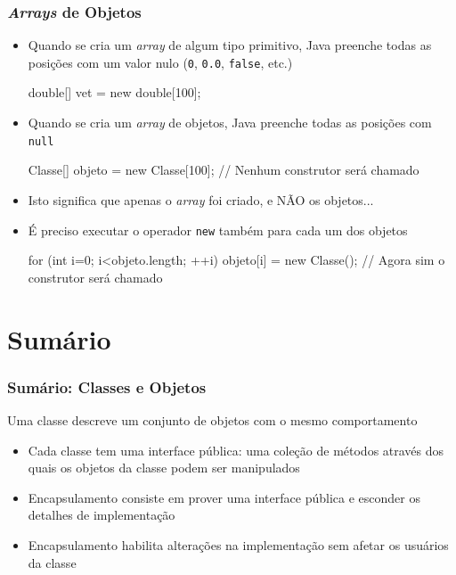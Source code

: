 \documentclass[xcolor={dvipsnames,table},aspectratio=169]{beamer}
\begin{document}
\begin{frame}[fragile]\frametitle{\emph{Arrays} de Objetos}
\begin{itemize}
	\item Quando se cria um \emph{array} de algum tipo primitivo, Java preenche todas as posições com um valor nulo (\texttt{0}, \texttt{0.0}, \texttt{false}, etc.)
{\footnotesize
\begin{javacode}
double[] vet = new double[100];
\end{javacode}
}
	\item Quando se cria um \emph{array} de objetos, Java preenche todas as posições com \texttt{null}
{\footnotesize
\begin{javacode}
Classe[] objeto = new Classe[100]; // Nenhum construtor será chamado	
\end{javacode}
}
	\item Isto significa que apenas o \emph{array} foi criado, e NÃO os objetos...
	\item É preciso executar o operador \texttt{new} também para cada um dos objetos
{\footnotesize
\begin{javacode}
for (int i=0; i<objeto.length; ++i)
    objeto[i] = new Classe(); // Agora sim o construtor será chamado
\end{javacode}
}
\end{itemize}
\end{frame}

\section{Sumário}

\begin{frame}\frametitle{Sumário: Classes e Objetos}
Uma classe descreve um conjunto de objetos com o mesmo comportamento
\begin{itemize}
	\item Cada classe tem uma interface pública: uma coleção de métodos através dos quais os objetos da classe podem ser manipulados
	\item Encapsulamento consiste em prover uma interface pública e esconder os detalhes de implementação
	\item Encapsulamento habilita alterações na implementação sem afetar os usuários da classe
\end{itemize}
\end{frame}
\end{document}
